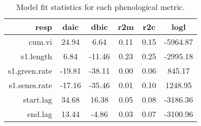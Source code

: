 \begin{table}[ht]
\centering
\begin{tabular}{rccccc}
  \hline
resp & daic & dbic & r2m & r2c & logl \\ 
  \hline
cum.vi & 24.94 & 6.64 & 0.11 & 0.15 & -5964.87 \\ 
  s1.length & 6.84 & -11.46 & 0.23 & 0.25 & -2995.18 \\ 
  s1.green.rate & -19.81 & -38.11 & 0.00 & 0.06 & 845.17 \\ 
  s1.senes.rate & -17.16 & -35.46 & 0.01 & 0.10 & 1248.95 \\ 
  start.lag & 34.68 & 16.38 & 0.05 & 0.08 & -3186.36 \\ 
  end.lag & 13.44 & -4.86 & 0.03 & 0.07 & -3100.96 \\ 
   \hline
\end{tabular}
\caption{Model fit statistics for each phenological metric.} 
\label{mod_stat}
\end{table}

